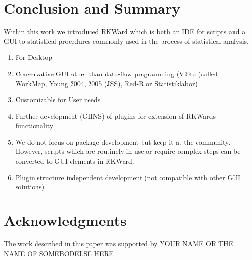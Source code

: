 \section{Conclusion and Summary}
\label{sec:conclusion_summary}
Within this work we introduced RKWard which is both an IDE for
 scripts and a GUI to statistical
procedures commonly used in the process of statistical analysis.

\begin{enumerate}
\item For Desktop
\item Conservative GUI other than data-flow programming (ViSta (called
WorkMap, Young 2004, 2005 (JSS), Red-R or Statistiklabor)
\item Customizable for User needs
\item Further development (GHNS) of plugins for extension of RKWards
functionality
\item We do not focus on  package
development but keep it at the  community.
However, scripts which are routinely in use or require complex steps
can be converted to GUI elements in RKWard.
\item Plugin structure independent development (not compatible with
other  GUI solutions)
\end{enumerate}

\section{Acknowledgments}
\label{sec:acknowledgments}
The work described in this paper was supported by YOUR NAME OR THE NAME
OF SOMEBODELSE HERE